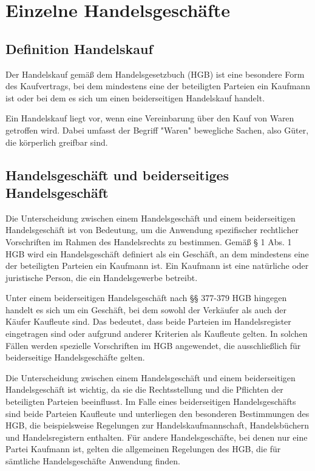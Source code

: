 
\chapter[Einzelne Handelsgeschäfte]{Einzelne Handelsgeschäfte}

\section{Definition Handelskauf}
Der Handelskauf gemäß dem Handelsgesetzbuch (HGB) ist eine besondere Form des Kaufvertrags, bei dem mindestens eine der beteiligten Parteien ein Kaufmann ist oder bei dem es sich um einen beiderseitigen Handelskauf handelt.

Ein Handelskauf liegt vor, wenn eine Vereinbarung über den Kauf von Waren getroffen wird. Dabei umfasst der Begriff "Waren" bewegliche Sachen, also Güter, die körperlich greifbar sind.


\section{Handelsgeschäft und beiderseitiges Handelsgeschäft}
Die Unterscheidung zwischen einem Handelsgeschäft und einem beiderseitigen Handelsgeschäft ist von Bedeutung, um die Anwendung spezifischer rechtlicher Vorschriften im Rahmen des Handelsrechts zu bestimmen. Gemäß § 1 Abs. 1 HGB wird ein Handelsgeschäft definiert als ein Geschäft, an dem mindestens eine der beteiligten Parteien ein Kaufmann ist. Ein Kaufmann ist eine natürliche oder juristische Person, die ein Handelsgewerbe betreibt.

Unter einem beiderseitigen Handelsgeschäft nach §§ 377-379 HGB hingegen handelt es sich um ein Geschäft, bei dem sowohl der Verkäufer als auch der Käufer Kaufleute sind. Das bedeutet, dass beide Parteien im Handelsregister eingetragen sind oder aufgrund anderer Kriterien als Kaufleute gelten. In solchen Fällen werden spezielle Vorschriften im HGB angewendet, die ausschließlich für beiderseitige Handelsgeschäfte gelten.

Die Unterscheidung zwischen einem Handelsgeschäft und einem beiderseitigen Handelsgeschäft ist wichtig, da sie die Rechtsstellung und die Pflichten der beteiligten Parteien beeinflusst. Im Falle eines beiderseitigen Handelsgeschäfts sind beide Parteien Kaufleute und unterliegen den besonderen Bestimmungen des HGB, die beispielsweise Regelungen zur Handelskaufmannschaft, Handelsbüchern und Handelsregistern enthalten. Für andere Handelsgeschäfte, bei denen nur eine Partei Kaufmann ist, gelten die allgemeinen Regelungen des HGB, die für sämtliche Handelsgeschäfte Anwendung finden.
